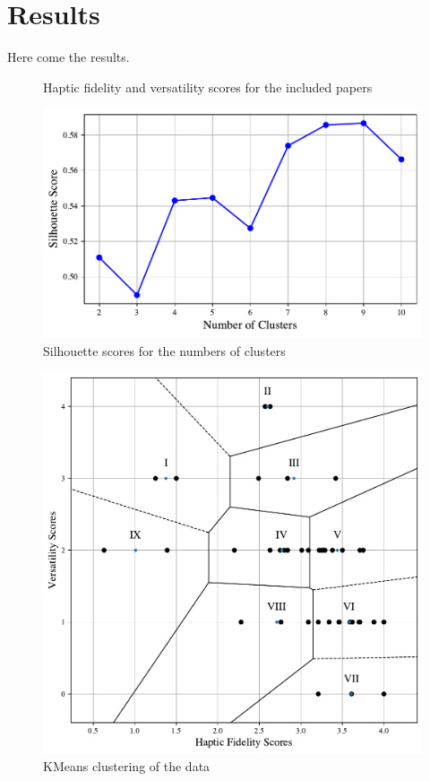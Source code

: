 \twocolumn

\section{Results}
Here come the results.

\begin{figure}
    
    \caption{Haptic fidelity and versatility scores for the included papers}
    \label{fig:fidelity_plot}
\end{figure}


\begin{figure}[]
    \centering
    \includegraphics[width=\columnwidth]{figures/silhouette.pdf} 
    \caption{Silhouette scores for the numbers of clusters}
    \label{fig:silhouette}
\end{figure}

\begin{figure}[]
    \centering
    \includegraphics[width=\columnwidth]{figures/literature_data.pdf} 
    \caption{KMeans clustering of the data}
    \label{fig:kmeans}
\end{figure}




